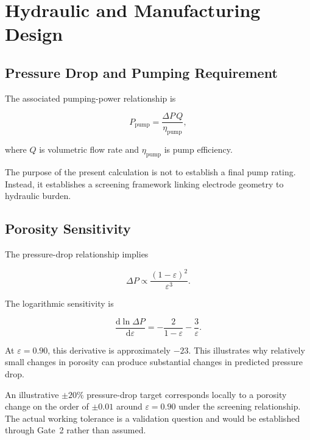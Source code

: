 \documentclass[11pt,letterpaper]{article}
\begin{document}
\section{Hydraulic and Manufacturing Design}

\subsection{Pressure Drop and Pumping Requirement}

The associated pumping-power relationship is

\begin{equation}
P_{\mathrm{pump}}
=
\frac{\Delta P\,Q}
{\eta_{\mathrm{pump}}},
\label{eq:pump-power}
\end{equation}

where $Q$ is volumetric flow rate and $\eta_{\mathrm{pump}}$ is pump
efficiency.

The purpose of the present calculation is not to establish a final pump
rating. Instead, it establishes a screening framework linking electrode
geometry to hydraulic burden.

\subsection{Porosity Sensitivity}

The pressure-drop relationship implies

\begin{equation}
\Delta P
\propto
\frac{(1-\varepsilon)^2}{\varepsilon^3}.
\label{eq:porosity-dependence}
\end{equation}

The logarithmic sensitivity is

\begin{equation}
\frac{\mathrm{d}\ln\Delta P}
{\mathrm{d}\varepsilon}
=
-\frac{2}{1-\varepsilon}
-\frac{3}{\varepsilon}.
\label{eq:porosity-sensitivity}
\end{equation}

At $\varepsilon=0.90$, this derivative is approximately $-23$. This
illustrates why relatively small changes in porosity can produce substantial
changes in predicted pressure drop.

An illustrative $\pm20\%$ pressure-drop target corresponds locally to a
porosity change on the order of $\pm0.01$ around $\varepsilon=0.90$ under
the screening relationship. The actual working tolerance is a validation
question and would be established through Gate~2 rather than assumed.
\end{document}
